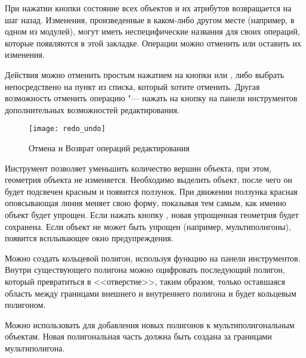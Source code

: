При нажатии кнопки  состояние всех объектов и их атрибутов
возвращается на шаг назад. Изменения, произведенные в каком-либо другом
месте (например, в одном из модулей), могут иметь неспецифические названия
для своих операций, которые появляются в этой закладке. Операции можно
отменить или оставить их изменения.

Действия можно отменить простым нажатием на кнопки  или
, либо выбрать непосредствено на пункт из списка, который
хотите отменить. Другая возможность отменить операцию "--- нажать на кнопку
 на панели инструментов дополнительных возможностей
редактирования.

\begin{figure}[ht]
   \centering
   \texttt{[image: redo\_undo]}
   \caption{Отмена и Возврат операций редактирования \wincaption}\label{fig:vector_redoundo}
\end{figure}


Инструмент  позволяет уменьшить
количество вершин объекта, при этом, геометрия объекта не изменяется.
Необходимо выделить объект, после чего он будет подсвечен красным и появится
ползунок. При движении ползунка красная опоясывающая линия меняет свою форму,
показывая тем самым, как именно объект будет упрощен. Если нажать кнопку ,
новая упрощенная геометрия будет сохранена. Если объект не может быть
упрощен (например, мультиполигоны), появится всплывающее окно предупреждения.


Можно создать кольцевой полигон, используя функцию
 на панели инструментов. Внутри
существующего полигона можно оцифровать последующий полигон, который
превратиться в <<отверстие>>, таким образом, только оставшаяся область
между границами внешнего и внутреннего полигона и будет кольцевым полигоном.


Можно использовать 
для добавления новых полигонов к мультиполигональным объектам. Новая
полигональная часть должна быть создана за границами мультиполигона.



